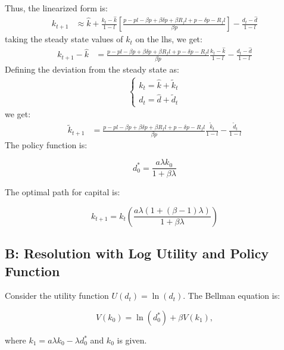 \documentclass[12pt]{report}
\begin{document}
Thus, the linearized form is:
\begin{align}
    k_{t+1} &\approx \hat{k} + \frac{k_t - \hat{k}}{1-l}\left[ \frac{p - p l - \beta p + \beta \delta p + \beta R_f l + p - \delta p - R_f l}{\beta p} \right] \nonumber 
     - \frac{d_t - \hat{d}}{1-l}
\end{align}
taking the steady state values of \(k_t\) on the lhs, we get:
\begin{align}
    k_{t+1} -\hat{k} &= \frac{p - p l - \beta p + \beta \delta p + \beta R_f l + p - \delta p - R_f l}{\beta p} \frac{ k_t - \hat{k}}{1-l} \nonumber 
    - \frac{d_t - \hat{d}}{1-l}
\end{align}
Defining the deviation from the steady state as:
\begin{align}
    \begin{cases}
        k_t = \hat{k} + \tilde{k}_t \\
        d_t = \hat{d} + \tilde{d}_t
    \end{cases}
\end{align}
we get:
\begin{align}
    \tilde{k}_{t+1} &= \frac{p - p l - \beta p + \beta \delta p + \beta R_f l + p - \delta p - R_f l}{\beta p} \frac{ \tilde{k}_t}{1-l} - \frac{\tilde{d}_t}{1-l} \label{eq:linearized_flow}
\end{align}
The policy function is:
  
\begin{equation}
d_0^* = \frac{a \lambda k_0}{1 + \beta \lambda}
\end{equation}

The optimal path for capital is:

\begin{equation}
    k_{t+1} = k_t \left( \frac{a \lambda (1 + (\beta - 1) \lambda)}{1 + \beta \lambda} \right)
\end{equation}



\subsection{B: Resolution with Log Utility and Policy Function}

  Consider the utility function \( U(d_t) = \ln(d_t) \). The Bellman equation is:
  
  \[
  V(k_0) = \ln(d_0^*) + \beta V(k_1),
  \]
  
  where \( k_1 = a \lambda k_0 - \lambda d_0^* \) and \( k_0 \) is given.
  
\end{document}

